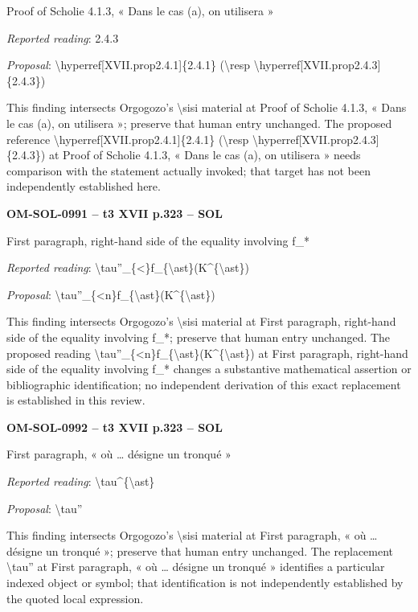 Proof of Scholie 4.1.3, « Dans le cas (a), on utilisera »\par
\emph{Reported reading}: 2.4.3\par
\emph{Proposal}: \textbackslash{}hyperref[XVII.prop2.4.1]\{2.4.1\} (\textbackslash{}resp \textbackslash{}hyperref[XVII.prop2.4.3]\{2.4.3\})\par
This finding intersects Orgogozo's \textbackslash{}sisi material at Proof of Scholie 4.1.3, « Dans le cas (a), on utilisera »; preserve that human entry unchanged. The proposed reference \textbackslash{}hyperref[XVII.prop2.4.1]\{2.4.1\} (\textbackslash{}resp \textbackslash{}hyperref[XVII.prop2.4.3]\{2.4.3\}) at Proof of Scholie 4.1.3, « Dans le cas (a), on utilisera » needs comparison with the statement actually invoked; that target has not been independently established here.\par
\par\noindent\textbf{OM-SOL-0991 -- t3 XVII p.323 -- SOL}\par
First paragraph, right-hand side of the equality involving f\_*\par
\emph{Reported reading}: \textbackslash{}tau''\_\{<\}f\_\{\textbackslash{}ast\}(K\textasciicircum{}\{\textbackslash{}ast\})\par
\emph{Proposal}: \textbackslash{}tau''\_\{<n\}f\_\{\textbackslash{}ast\}(K\textasciicircum{}\{\textbackslash{}ast\})\par
This finding intersects Orgogozo's \textbackslash{}sisi material at First paragraph, right-hand side of the equality involving f\_*; preserve that human entry unchanged. The proposed reading \textbackslash{}tau''\_\{<n\}f\_\{\textbackslash{}ast\}(K\textasciicircum{}\{\textbackslash{}ast\}) at First paragraph, right-hand side of the equality involving f\_* changes a substantive mathematical assertion or bibliographic identification; no independent derivation of this exact replacement is established in this review.\par
\par\noindent\textbf{OM-SOL-0992 -- t3 XVII p.323 -- SOL}\par
First paragraph, « où … désigne un tronqué »\par
\emph{Reported reading}: \textbackslash{}tau\textasciicircum{}\{\textbackslash{}ast\}\par
\emph{Proposal}: \textbackslash{}tau''\par
This finding intersects Orgogozo's \textbackslash{}sisi material at First paragraph, « où … désigne un tronqué »; preserve that human entry unchanged. The replacement \textbackslash{}tau'' at First paragraph, « où … désigne un tronqué » identifies a particular indexed object or symbol; that identification is not independently established by the quoted local expression.\par
